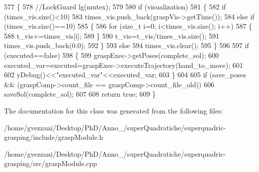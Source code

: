 \begin{DoxyCode}
577 \{    
578     \textcolor{comment}{//LockGuard lg(mutex);}
579 
580     \textcolor{keywordflow}{if} (visualization)
581     \{
582         \textcolor{keywordflow}{if} (times\_vis.size()<10)
583             times\_vis.push\_back(graspVis->getTime());
584         \textcolor{keywordflow}{else} \textcolor{keywordflow}{if} (times\_vis.size()==10)
585         \{
586             \textcolor{keywordflow}{for} (\textcolor{keywordtype}{size\_t} i=0; i<times\_vis.size(); i++)
587             \{
588                 t\_vis+=times\_vis[i];
589             \}
590             t\_vis=t\_vis/times\_vis.size();
591             times\_vis.push\_back(0.0);
592         \}
593         \textcolor{keywordflow}{else}
594             times\_vis.clear();
595     \}
596 
597     \textcolor{keywordflow}{if} (executed==\textcolor{keyword}{false})
598     \{
599         graspExec->getPoses(complete\_sol);
600         executed\_var=executed=graspExec->executeTrajectory(hand\_to\_move);
601 
602         yDebug()<<\textcolor{stringliteral}{"executed\_var"}<<executed\_var;
603     \}
604 
605     \textcolor{keywordflow}{if} (save\_poses && (graspComp->count\_file == graspComp->count\_file\_old))
606         saveSol(complete\_sol);
607 
608    \textcolor{keywordflow}{return} \textcolor{keyword}{true};
609 \}
\end{DoxyCode}


The documentation for this class was generated from the following files\+:\begin{DoxyCompactItemize}
\item 
/home/gvezzani/\+Desktop/\+Ph\+D/\+Anno\+\_/super\+Quadratiche/superquadric-\/grasping/include/grasp\+Module.\+h\item 
/home/gvezzani/\+Desktop/\+Ph\+D/\+Anno\+\_/super\+Quadratiche/superquadric-\/grasping/src/grasp\+Module.\+cpp\end{DoxyCompactItemize}
